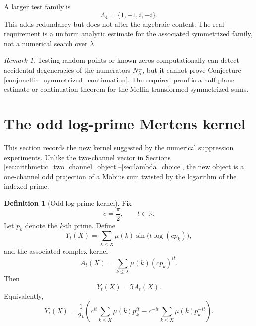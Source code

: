 \documentclass[11pt]{amsart}
\numberwithin{equation}{section}
\theoremstyle{plain}
\theoremstyle{definition}
\newtheorem{definition}[theorem]{Definition}
\theoremstyle{remark}
\newtheorem{remark}[theorem]{Remark}
\begin{document}
A larger test family is
\begin{equation}
\Lambda_4=\{1,-1,i,-i\}.
\label{eq:lambda_family_four}
\end{equation}
This adds redundancy but does not alter the algebraic content.  The real requirement is a uniform analytic estimate for the associated symmetrized family, not a numerical search over \(\lambda\).

\begin{remark}
\label{rem:random_zeros_computation}
Testing random points or known zeros computationally can detect accidental degeneracies of the numerators \(N_\lambda^\pm\), but it cannot prove Conjecture \ref{conj:mellin_symmetrized_continuation}.  The required proof is a half-plane estimate or continuation theorem for the Mellin-transformed symmetrized sums.
\end{remark}


\section{The odd log-prime Mertens kernel}
\label{sec:odd_log_prime_kernel}

This section records the new kernel suggested by the numerical suppression experiments.  Unlike the two-channel vector in Sections \ref{sec:arithmetic_two_channel_object}--\ref{sec:lambda_choice}, the new object is a one-channel odd projection of a M\"obius sum twisted by the logarithm of the indexed prime.

\begin{definition}[Odd log-prime kernel]
\label{def:odd_log_prime_kernel}
Fix
\begin{equation}
 c=\frac{\pi}{2},
 \qquad t\in\mathbb R.
\label{eq:odd_kernel_c_t}
\end{equation}
Let \(p_k\) denote the \(k\)-th prime.  Define
\begin{equation}
 Y_t(X)=\sum_{k\leq X}\mu(k)\sin\bigl(t\log(c p_k)\bigr),
\label{eq:Yt_definition}
\end{equation}
and the associated complex kernel
\begin{equation}
 A_t(X)=\sum_{k\leq X}\mu(k)(c p_k)^{it}.
\label{eq:At_definition}
\end{equation}
Then
\begin{equation}
Y_t(X)=\Im A_t(X).
\label{eq:Yt_im_At}
\end{equation}
Equivalently,
\begin{equation}
Y_t(X)=\frac{1}{2i}
\left(
 c^{it}\sum_{k\leq X}\mu(k)p_k^{it}
 -c^{-it}\sum_{k\leq X}\mu(k)p_k^{-it}
\right).
\label{eq:Yt_odd_decomposition}
\end{equation}
\end{definition}
\end{document}
